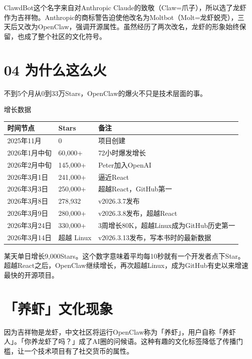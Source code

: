 \documentclass[
  10
]{article}
\newcounter{none} %
\begin{document}
ClawdBot这个名字来自对Anthropic
Claude的致敬（Claw=爪子），所以选了龙虾作为吉祥物。Anthropic的商标警告迫使他改名为Moltbot（Molt=龙虾蜕壳），三天后又改为OpenClaw，强调开源属性。虽然经历了两次改名，龙虾的形象始终保留，也成了整个社区的文化符号。

\section{04 为什么这么火}\label{ux4e3aux4ec0ux4e48ux8fd9ux4e48ux706b}

不到5个月从0到33万Stars，OpenClaw的爆火不只是技术层面的事。

增长数据

{\def\LTcaptype{none} %
\begin{longtable}[]{@{}|l|l|l|@{}}
\toprule\noalign{}
\endhead
\bottomrule\noalign{}
\endlastfoot
\hline
时间节点 & Stars & 备注 \\
\hline
2025年11月 & 0 & 项目创建 \\
\hline
2026年1月中旬 & 60,000+ & 72小时爆发增长 \\
\hline
2026年2月中旬 & 145,000+ & Peter加入OpenAI \\
\hline
2026年3月1日 & 241,000+ & 逼近React \\
\hline
2026年3月3日 & 250,000+ & 超越React，GitHub第一 \\
\hline
2026年3月8日 & 278,932 & v2026.3.7发布 \\
\hline
2026年3月9日 & 280,000+ & v2026.3.8发布，超越React \\
\hline
2026年3月24日 & 330,000+ & 3周增长80K，超越Linux成为GitHub历史第一 \\
\hline
2026年3月14日 & 超越 Linux & v2026.3.13发布，写本书时的最新数据 \\
\hline
\end{longtable}
}

某天单日增长9,000Stars。这个数字意味着平均每10秒就有一个开发者点下Star。超越React之后，OpenClaw继续增长，再次超越Linux，成为GitHub有史以来增速最快的开源项目。

\section{「养虾」文化现象}\label{ux517bux867eux6587ux5316ux73b0ux8c61}

因为吉祥物是龙虾，中文社区将运行OpenClaw称为「养虾」，用户自称「养虾人」。「你养龙虾了吗？」成了AI圈的问候语。这种有趣的文化标签降低了传播门槛，让一个技术项目有了社交货币的属性。
\end{document}
